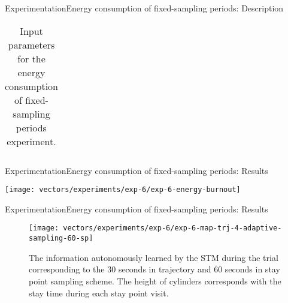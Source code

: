 \begin{frame}{Experimentation}{Energy consumption of fixed-sampling periods: Description}
\begin{table}
{\begin{tabular}{@{}lll@{}}
\bottomrule
\end{tabular}%
}
\caption{Input parameters for the energy consumption of fixed-sampling periods experiment.}
\label{tab:exp-6-input-parameters}
\end{table}
\end{frame}

\begin{frame}{Experimentation}{Energy consumption of fixed-sampling periods: Results}
\vspace{-0.4cm}
{
  \centering
  \texttt{[image: vectors/experiments/exp-6/exp-6-energy-burnout]}
  \par
}
\end{frame}

\begin{frame}{Experimentation}{Energy consumption of fixed-sampling periods: Results}
\begin{figure}
  \texttt{[image: vectors/experiments/exp-6/exp-6-map-trj-4-adaptive-sampling-60-sp]}
  \caption{The information autonomously learned by the STM during the trial corresponding to the 30 seconds in trajectory and 60 seconds in stay point sampling scheme. The height of cylinders corresponds with the stay time during each stay point visit.}
  \label{fig:exp-6-stm-60-seconds-sp}
\end{figure}
\end{frame}


